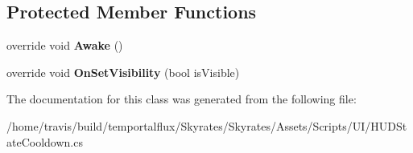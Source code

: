 \subsection*{Protected Member Functions}
\begin{DoxyCompactItemize}
\item 
\hypertarget{class_skyrates_1_1_u_i_1_1_h_u_d_state_cooldown_a86fb954d656fe5b163c1350df131d306}{override void {\bfseries Awake} ()}\label{class_skyrates_1_1_u_i_1_1_h_u_d_state_cooldown_a86fb954d656fe5b163c1350df131d306}

\item 
\hypertarget{class_skyrates_1_1_u_i_1_1_h_u_d_state_cooldown_aeded3b6e94e9271f1b0848eb2a619bf4}{override void {\bfseries On\-Set\-Visibility} (bool is\-Visible)}\label{class_skyrates_1_1_u_i_1_1_h_u_d_state_cooldown_aeded3b6e94e9271f1b0848eb2a619bf4}

\end{DoxyCompactItemize}


The documentation for this class was generated from the following file\-:\begin{DoxyCompactItemize}
\item 
/home/travis/build/temportalflux/\-Skyrates/\-Skyrates/\-Assets/\-Scripts/\-U\-I/H\-U\-D\-State\-Cooldown.\-cs\end{DoxyCompactItemize}
